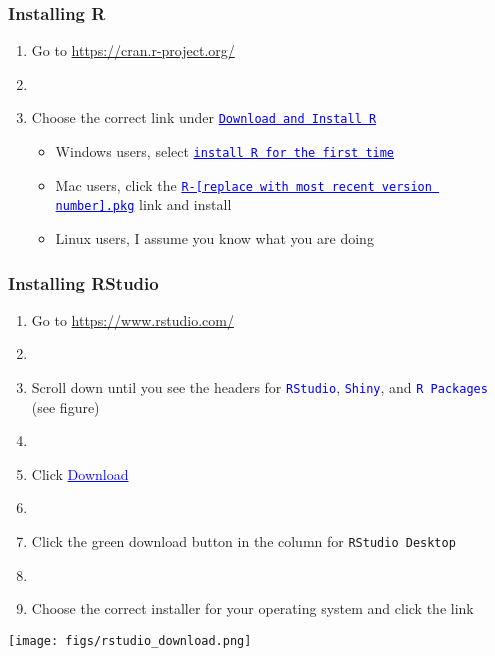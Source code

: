 \documentclass[11pt]{beamer}
\newcommand{\myframe}[1]{\begin{frame} \frametitle{#1}}
\newenvironment{spaceitemize}
{ \begin{itemize}
    \setlength{\itemsep}{10pt}
    \setlength{\parskip}{0pt}
    \setlength{\parsep}{0pt}     }
{ \end{itemize}                  }
\begin{document}
\myframe{Installing R}
\begin{enumerate}
\item Go to \url{https://cran.r-project.org/}
\item[]
\item Choose the correct link under \textcolor{blue}{\underline{\texttt{Download and Install R}}}
\begin{spaceitemize}
\item Windows users, select \textcolor{blue}{\underline{\texttt{install R for the first time}}}
\item Mac users, click the \textcolor{blue}{\underline{\texttt{R-[replace with most recent version number].pkg}}} link and install
\item Linux users, I assume you know what you are doing
\end{spaceitemize}
\end{enumerate}

\end{frame}

\myframe{Installing RStudio}
\begin{enumerate}
\item Go to \url{https://www.rstudio.com/}
\item[]
\item Scroll down until you see the headers for \textcolor{blue}{\texttt{RStudio}}, \textcolor{blue}{\texttt{Shiny}}, and \textcolor{blue}{\texttt{R Packages}}  (see figure)
\item[]
\item Click \textcolor{blue}{\underline{Download}}
\item[] 
\item Click the green download button in the column for \texttt{RStudio Desktop}
\item[]
\item Choose the correct installer for your operating system and click the link
\end{enumerate}
\centering
\texttt{[image: figs/rstudio\_download.png]}
\end{frame}
\end{document}
